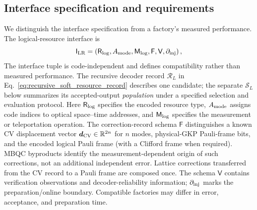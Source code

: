 \documentclass[aps,
prx,
superscriptaddress,
reprint,
longbibliography,
floatfix]{revtex4-2}
\begin{document}
\subsection{Interface specification and requirements}
We distinguish the interface specification from a factory's measured performance. The logical-resource interface is
\begin{equation}
\mathsf I_{\rm LR}=
\left(\mathsf R_{\rm log},A_{\rm mode},\mathsf M_{\rm log},
\mathsf F,\mathsf V,\partial_{\rm inj}\right),
\label{eq:logical_resource_interface}
\end{equation}
The interface tuple is code-independent and defines compatibility rather than measured performance. The recursive decoder record $\mathcal R_L$ in Eq.~\eqref{eq:recursive_soft_resource_record} describes one candidate; the separate $\mathcal S_L$ below summarizes its accepted-output \emph{population} under a specified selection and evaluation protocol.
Here $\mathsf R_{\rm log}$ specifies the encoded resource type, $A_{\rm mode}$ assigns code indices to optical space--time addresses, and $\mathsf M_{\rm log}$ specifies the measurement or teleportation operation. The correction-record schema $\mathsf F$ distinguishes a known CV displacement vector $\boldsymbol d_{\rm CV}\in\mathbb R^{2n}$ for $n$ modes, physical-GKP Pauli-frame bits, and the encoded logical Pauli frame (with a Clifford frame when required). MBQC byproducts identify the measurement-dependent origin of such corrections, not an additional independent error. Lattice corrections transferred from the CV record to a Pauli frame are composed once. The schema $\mathsf V$ contains verification observations and decoder-reliability information; $\partial_{\rm inj}$ marks the preparation/online boundary. Compatible factories may differ in error, acceptance, and preparation time.
\end{document}
